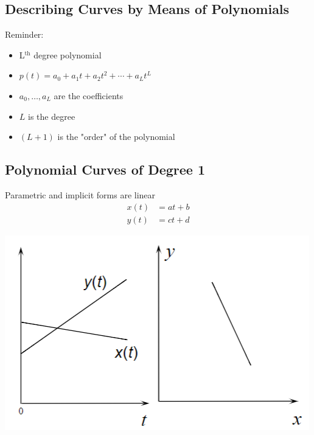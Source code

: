 \documentclass{article}
\begin{document}
\subsection*{Describing Curves by Means of Polynomials}
Reminder:
\begin{itemize}
    \item L$^{\text{th}}$ degree polynomial
    \item $p(t) = a_0 + a_1 t + a_2 t^2 + \cdots + a_L t^L$
    \item $a_0, \dots, a_L$ are the coefficients
    \item $L$ is the degree
    \item $(L + 1)$ is the "order" of the polynomial
\end{itemize}

\subsection*{Polynomial Curves of Degree 1}
Parametric and implicit forms are linear
\begin{align*}
    x(t) &= at + b \\
    y(t) &= ct + d
\end{align*}
\begin{center}
    \includegraphics*[scale=0.8]{W3_1.png}
\end{center}
\end{document}
